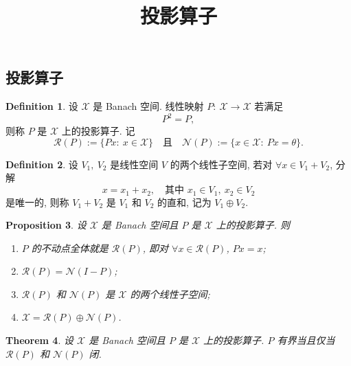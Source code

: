 \documentclass[a4paper,11pt]{article}
\title{投影算子}
\newtheorem{theorem}{Theorem}[section]
\newtheorem{proposition}[theorem]{Proposition}
\theoremstyle{definition}
\newtheorem{definition}[theorem]{Definition}
\begin{document}
\begin{CJK*}{UTF8}{gbsn}

\maketitle

\section{投影算子}

\begin{definition}
    设 $ \mathcal{X} $ 是 Banach 空间. 线性映射 $ P :\ \mathcal{X} \to \mathcal{X} $ 若满足
    $$
        P^2 = P,
    $$
    则称 $ P $ 是 $ \mathcal{X} $ 上的投影算子. 记 
    $$
        \mathcal{R}(P) := \{ P x :\ x \in \mathcal{X}\} 
        \quad \text{且} \quad
        \mathcal{N}(P) := \{x \in \mathcal{X} :\ Px = \theta \}.
    $$
\end{definition}

\begin{definition}
    设 $ V_1,\ V_2 $ 是线性空间 $ V $ 的两个线性子空间, 若对 $ \forall x \in V_1 + V_2 $,
    分解 
    $$  
        x = x_1 + x_2, \quad \text{其中 } x_1 \in V_1,\ x_2 \in V_2
    $$
    是唯一的, 则称 $ V_1 + V_2 $ 是 $ V_1 $ 和 $ V_2 $ 的直和, 记为 $ V_1 \oplus V_2 $.
\end{definition}

\begin{proposition}
    设 $ \mathcal{X} $ 是 Banach 空间且 $ P $ 是 $ \mathcal{X} $ 上的投影算子. 则
    \begin{enumerate}[{\rm(i)}]
        \item $ P $ 的不动点全体就是 $ \mathcal{R}(P) $, 即对 $ \forall x \in \mathcal{R}(P) $, $ Px = x $;
        \item $ \mathcal{R}(P) = \mathcal{N}(I - P) $;
        \item $ \mathcal{R}(P) $ 和 $ \mathcal{N}(P) $ 是 $ \mathcal{X} $ 的两个线性子空间;
        \item $ \mathcal{X} = \mathcal{R}(P) \oplus \mathcal{N}(P) $.
    \end{enumerate}
\end{proposition}


\begin{theorem} \label{3}
    设 $ \mathcal{X} $ 是 Banach 空间且 $ P $ 是 $ \mathcal{X} $ 上的投影算子. 
    $ P $ 有界当且仅当 $ \mathcal{R}(P) $ 和 $ \mathcal{N}(P) $ 闭.
\end{theorem}


\end{CJK*}
\end{document}
